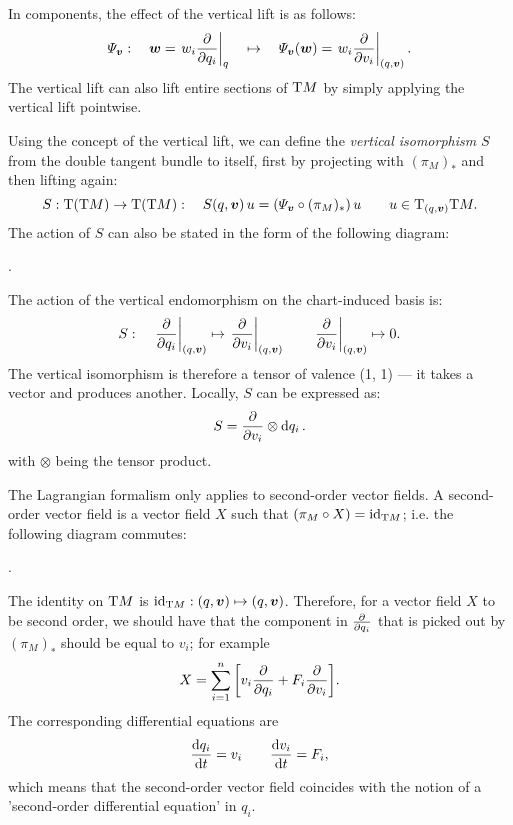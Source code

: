 In components, the effect of the vertical lift is as follows:
$$\Psi_{\vec{v}}: \quad \vec{w} = \left. w_i \pdv{}{q_i}\right|_q \quad \mapsto \quad  \Psi_{\vec{v}}(\vec{w}) = \left.w_i \pdv{}{v_i}\right|_{(q, \vec{v})}. $$
The vertical lift can also lift entire sections of $\mathrm{T}M$ by simply applying the vertical lift pointwise.

Using the concept of the vertical lift, we can define the \emph{vertical isomorphism} $S$ from the double tangent bundle to itself, first by projecting with $(\pi_M)_*$ and then lifting again:
$$ S: \tbundle{\qty(\tbundle{M})} \to \tbundle{\qty(\tbundle{M})}: \quad S(q, \vec{v})\,u = \qty(\Psi_{\vec{v}} \circ (\pi_M)_*)\,u \qquad u \in \tspace{(q, \vec{v})}{\tbundle{M}}.  $$
The action of $S$ can also be stated in the form of the following diagram:
\begin{center}
   .
\end{center}
The action of the vertical endomorphism on the chart-induced basis is:
$$ S: \quad \left. \pdv{}{q_i}\right|_{(q, \vec{v})} \mapsto \left.\pdv{}{v_i}\right|_{(q, \vec{v})} \qquad  \left. \pdv{}{v_i}\right|_{(q, \vec{v})} \mapsto 0. $$
The vertical isomorphism is therefore a tensor of valence (1, 1) --- it takes a vector and produces another. Locally, $S$ can be expressed as:
$$ S = \pdv{}{v_i}\otimes \dd{q_i}. $$
with $\otimes$ being the tensor product. \cite{Carinena1990}

The Lagrangian formalism only applies to second-order vector fields. A second-order vector field is a vector field $X$ such that $(\pi_M \circ X) = \mathrm{id}_{\mathrm{T}M}$; i.e. the following diagram commutes: \cite{Abraham1978}
\begin{center}
   .
\end{center}
The identity on $\mathrm{T}M$ is $\mathrm{id}_{\tbundle{M}}: (q, \vec{v}) \mapsto (q, \vec{v})$. Therefore, for a vector field $X$ to be second order, we should have that the component in $\pdv{}{q_i}$ that is picked out by $(\pi_M)_*$ should be equal to $v_i$; for example
$$ X = \sum_{i=1}^n \qty[v_i \pdv{q_i} + F_i\pdv{v_i}]. $$
The corresponding differential equations are
$$ \dv{q_i}{t} = v_i \qquad \dv{v_i}{t} = F_i, $$
which means that the second-order vector field coincides with the notion of a 'second-order differential equation' in $q_i$.

